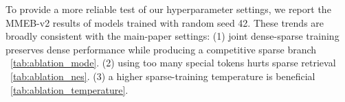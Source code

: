 To provide a more reliable test of our hyperparameter settings, we report the MMEB-v2 results of models trained with random seed 42. These trends are broadly consistent with the main-paper settings: 
(1) joint dense-sparse training preserves dense performance while producing a competitive sparse branch ~\autoref{tab:ablation_mode}. 
(2) using too many special tokens hurts sparse retrieval ~\autoref{tab:ablation_nes}. 
(3) a higher sparse-training temperature is beneficial ~\autoref{tab:ablation_temperature}. 





